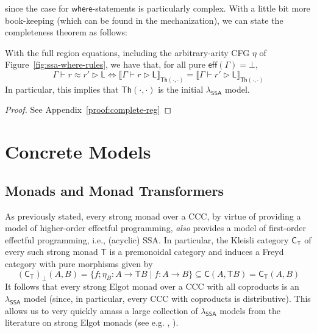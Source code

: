 \documentclass[acmsmall,screen,review]{acmart}
\newcommand{\ms}[1]{\ensuremath{\mathsf{#1}}}
\newcommand{\haslb}[3]{#1 \vdash #2 \rhd #3}
\newcommand{\teqv}{\approx}
\newcommand{\lbeq}[4]{#1 \vdash #2 \teqv #3 \rhd {#4}}
\newcommand{\dnt}[1]{\llbracket{#1}\rrbracket}
\newcommand{\isotopessa}{\(\lambda_{\ms{SSA}}\)}
\begin{document}
since the case for \ms{where}-statements is particularly complex. With a little bit more book-keeping (which can be found in the mechanization), we can state the completeness theorem as follows:
\begin{theorem}[name=Completeness (Regions), restate=completenessregions]
  With the full region equations, including the arbitrary-arity CFG $\eta$
  of Figure~\ref{fig:ssa-where-rules}, we have that, for all pure
  $\ms{eff}(\Gamma) = \bot$,
  $$
    \lbeq{\Gamma}{r}{r'}{\ms{L}} 
    \iff \dnt{\haslb{\Gamma}{r}{\ms{L}}}_{\ms{Th}(\cdot, \cdot)} 
        = \dnt{\haslb{\Gamma}{r'}{\ms{L}}}_{\ms{Th}(\cdot, \cdot)} 
  $$
  In particular, this implies that $\ms{Th}(\cdot, \cdot)$ is the initial \isotopessa{} model.
  \label{thm:complete-reg}
\end{theorem}
\begin{proof}
  See Appendix~\ref{proof:complete-reg}
\end{proof}

\section{Concrete Models}

\label{sec:concrete}

\subsection{Monads and Monad Transformers}

As previously stated, every strong monad over a CCC, by virtue of providing a
model of higher-order effectful programming, \emph{also} provides a model of
first-order effectful programming, i.e., (acyclic) SSA. In particular, the Kleisli
category $\ms{C}_{\ms{T}}$ of every such strong monad $\ms{T}$ is a premonoidal category and
induces a Freyd category with pure morphisms given by
\begin{equation}
  (\ms{C}_{\ms{T}})_{\bot}(A, B) = \{f;\eta_B : A \to \ms{T}B \mid f : A \to B\} 
  \subseteq \ms{C}(A, \ms{T}B) = \ms{C}_{\ms{T}}(A, B)
\end{equation}
It follows that every strong Elgot monad over a CCC with all coproducts is an \isotopessa{} model
(since, in particular, every CCC with coproducts is distributive). This allows us to very quickly
amass a large collection of \isotopessa{} models from the literature on strong Elgot monads (see
e.g. \cite{goncharov-18-guarded-traced}, \cite{goncharov-21-uniform-elgot}).
\end{document}
